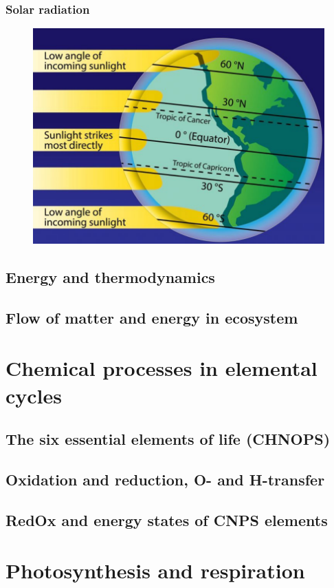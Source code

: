 \documentclass{article}
\newcommand{\cfig}[1]{%
  \begin{figure}[ht!]%
    \centering%
    #1%
  \end{figure}%
}
\begin{document}
\subsubsection{Solar radiation}

\cfig{\includegraphics*[width=.5\textwidth]{media/solar-radiation.png}}


\subsection{Energy and thermodynamics}



\subsection{Flow of matter and energy in ecosystem}



\section{Chemical processes in elemental cycles}
\subsection{The six essential elements of life (CHNOPS)}



\subsection{Oxidation and reduction, O- and H-transfer}



\subsection{RedOx and energy states of CNPS elements}



\section{Photosynthesis and respiration}
\end{document}
